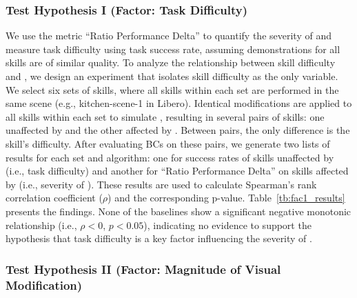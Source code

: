 \subsubsection{Test Hypothesis I (Factor: Task Difficulty)}

We use the metric ``Ratio Performance Delta'' to quantify the severity of \pb and measure task difficulty using task success rate, assuming demonstrations for all skills are of similar quality. To analyze the relationship between skill difficulty and \pb, we design an experiment that isolates skill difficulty as the only variable. We select six sets of skills, where all skills within each set are performed in the same scene (e.g., kitchen-scene-1 in Libero). Identical modifications are applied to all skills within each set to simulate \pb, resulting in several pairs of skills: one unaffected by \pb and the other affected by \pb. Between pairs, the only difference is the skill's difficulty. After evaluating BCs on these pairs, we generate two lists of results for each set and algorithm: one for success rates of skills unaffected by \pb (i.e., task difficulty) and another for ``Ratio Performance Delta'' on skills affected by \pb (i.e., severity of \pb). These results are used to calculate Spearman's rank correlation coefficient ($\rho$) and the corresponding p-value. Table~\ref{tb:fac1_results} presents the findings. None of the baselines show a significant negative monotonic relationship (i.e., $\rho < 0$, $p < 0.05$), indicating no evidence to support the hypothesis that task difficulty is a key factor influencing the severity of \pb.


\subsubsection{Test Hypothesis II (Factor: Magnitude of Visual Modification)}
% 


